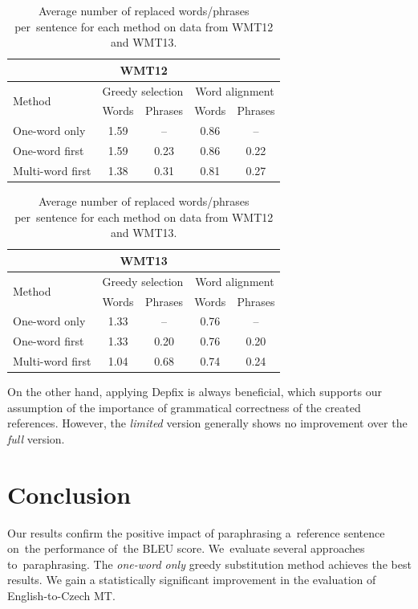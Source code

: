 \begin{table}[htb]
\begin{center}
\begin{tabular}{l|cc|cc}
\multicolumn{5}{c}{\textbf{WMT12}}\\
\hline
\multirow{2}{*}{Method} & \multicolumn{2}{c|}{Greedy selection} & \multicolumn{2}{c}{Word alignment} \\
& Words & Phrases & Words & Phrases \\
\hline
One-word only     & 1.59 & --   & 0.86 &  --  \\
One-word first    & 1.59 & 0.23 & 0.86 & 0.22 \\
Multi-word first  & 1.38 & 0.31 & 0.81 & 0.27 \\
\end{tabular}
\vspace{10pt}
\begin{tabular}{l|cc|cc}
\multicolumn{5}{c}{\textbf{WMT13}}\\
\hline
\multirow{2}{*}{Method} & \multicolumn{2}{c|}{Greedy selection} & \multicolumn{2}{c}{Word alignment} \\
& Words & Phrases & Words & Phrases \\
\hline
One-word only    & 1.33 &  --  & 0.76 & --   \\
One-word first   & 1.33 & 0.20 & 0.76 & 0.20 \\
Multi-word first & 1.04 & 0.68 & 0.74 & 0.24 \\
\end{tabular}

\caption{Average number of replaced words/phrases per~sentence for each method 
on data from WMT12 and WMT13.}
\label{substitutions:12:13}
\end{center}
\end{table}

On the other hand, applying Depfix is always beneficial, which supports our
 assumption of the importance of grammatical correctness of the created
references. However, the \textit{limited} version generally shows no 
improvement over the \textit{full} version.


\section{Conclusion}
Our results confirm the positive impact of paraphrasing a~reference sentence 
on~the performance of~the BLEU score. We~evaluate several approaches 
to~paraphrasing. The \textit{one-word only} greedy substitution method 
achieves the best results. We gain a statistically significant improvement 
in the evaluation of English-to-Czech MT. 

